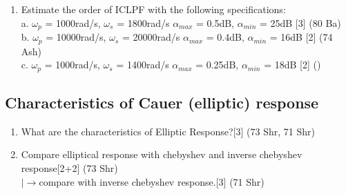\documentclass[12pt]{article}
\newcommand{\w}{\(\omega\)}
\newcommand{\lb}{\\$\left|\rightarrow\right.$}
\begin{document}
\begin{enumerate}
				\item Estimate the order of ICLPF with the following specifications:\\
				a. \w$_p$ = 1000rad/s, \w$_s$ = 1800rad/s \hspace{3cm}
				$\alpha_{max}$ = 0.5dB, $\alpha_{min}$ = 25dB \hfill[3] (80 Ba)\\
				b. \w$_p$ = 10000rad/s, \w$_s$ = 20000rad/s \hspace{2.5cm}
				$\alpha_{max}$ = 0.4dB, $\alpha_{min}$ = 16dB \hfill[2] (74 Ash)\\
				c. \w$_p$ = 1000rad/s, \w$_s$ = 1400rad/s \hspace{3cm}
				$\alpha_{max}$ = 0.25dB, $\alpha_{min}$ = 18dB \hfill[2] ()
				\end{enumerate}
				\subsection{Characteristics of Cauer (elliptic) response}
				\begin{enumerate}
				\item What are the characteristics of Elliptic Response?\hfill[3] (73 Shr, 71 Shr)
				\item Compare elliptical response with chebyshev and inverse chebyshev response\hfill[2+2] (73 Shr)
				\lb compare with inverse chebyshev response.\hfill[3] (71 Shr)
			\end{enumerate}
\end{document}

